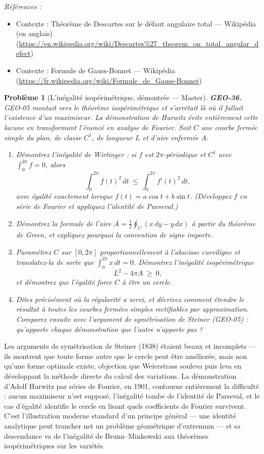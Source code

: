 \documentclass[11pt]{article}
\newtheorem{problem}{Problème}
\newenvironment{refs}{\par\small\noindent\emph{Références :}\begin{itemize}\setlength\itemsep{0pt}}{\end{itemize}\normalsize}
\begin{document}
\begin{refs}
\item Contexte : Théorème de Descartes sur le défaut angulaire total --- Wikipédia (en anglais) (\url{https://en.wikipedia.org/wiki/Descartes%27_theorem_on_total_angular_defect})
\item Contexte : Formule de Gauss-Bonnet --- Wikipédia (\url{https://fr.wikipedia.org/wiki/Formule_de_Gauss-Bonnet})
\end{refs}

\bigskip

\begin{problem}[{L'inégalité isopérimétrique, démontrée --- Master}]
\textbf{GEO-36.} GEO-05 montait vers le théorème isopérimétrique et s'arrêtait là où il fallait
l'existence d'un maximiseur. La démonstration de Hurwitz évite entièrement cette lacune en
transformant l'énoncé en analyse de Fourier. Soit $ C $ une courbe fermée simple du plan, de
classe $ C^1 $, de longueur $ L $ et d'aire enfermée $ A $.
\begin{enumerate}
\item[(a)] Démontrez l'inégalité de Wirtinger : si $ f $ est $ 2\pi $-périodique et $ C^1 $ avec
$ \int_0^{2\pi} f = 0 $, alors
\[ \int_0^{2\pi} f(t)^2 \, dt \ \le \ \int_0^{2\pi} f'(t)^2 \, dt , \]
avec égalité exactement lorsque $ f(t) = a\cos t + b \sin t $. (Développez $ f $ en série de
Fourier et appliquez l'identité de Parseval.)
\item[(b)] Démontrez la formule de l'aire $ A = \tfrac12 \oint_C (x \, dy - y \, dx) $ à partir du
théorème de Green, et expliquez pourquoi la convention de signe importe.
\item[(c)] Paramétrez $ C $ sur $ [0, 2\pi] $ proportionnellement à l'abscisse curviligne et
translatez-la de sorte que $ \int_0^{2\pi} x \, dt = 0 $. Démontrez l'inégalité isopérimétrique
\[ L^2 - 4\pi A \ \ge \ 0 , \]
et démontrez que l'égalité force $ C $ à être un cercle.
\item[(d)] Dites précisément où la régularité a servi, et décrivez comment étendre le résultat à toutes
les courbes fermées simples rectifiables par approximation. Comparez ensuite avec l'argument de
symétrisation de Steiner (GEO-05) : qu'apporte chaque démonstration que l'autre n'apporte
pas ?
\end{enumerate}

\end{problem}

\noindent Les arguments de symétrisation de Steiner (1838) étaient beaux et incomplets --- ils
montrent que toute forme autre que le cercle peut être améliorée, mais non qu'une forme optimale
existe, objection que Weierstrass souleva puis leva en développant la méthode directe du calcul des
variations. La démonstration d'Adolf Hurwitz par séries de Fourier, en 1901, contourne entièrement
la difficulté : aucun maximiseur n'est supposé, l'inégalité tombe de l'identité de Parseval, et le
cas d'égalité identifie le cercle en lisant quels coefficients de Fourier survivent. C'est
l'illustration moderne standard d'un principe général --- une identité analytique peut trancher net
un problème géométrique d'extremum --- et sa descendance va de l'inégalité de Brunn--Minkowski aux
théorèmes isopérimétriques sur les variétés.
\end{document}
